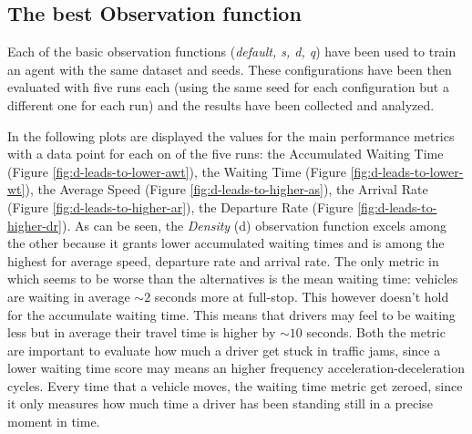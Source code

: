 \subsection{The best Observation function}

Each of the basic observation functions (\textit{default, s, d, q}) have been used to train an agent with the same dataset and seeds. These configurations have been then evaluated with five runs each (using the same seed for each configuration but a different one for each run) and the results have been collected and analyzed.

In the following plots are displayed the values for the main performance metrics with a data point for each on of the five runs: the Accumulated Waiting Time (Figure \ref{fig:d-leads-to-lower-awt}), the Waiting Time (Figure \ref{fig:d-leads-to-lower-wt}), the Average Speed (Figure \ref{fig:d-leads-to-higher-as}), the Arrival Rate (Figure \ref{fig:d-leads-to-higher-ar}), the Departure Rate (Figure \ref{fig:d-leads-to-higher-dr}).
As can be seen, the \textit{Density} (d) observation function excels among the other because it grants lower accumulated waiting times and is among the highest for average speed, departure rate and arrival rate.
The only metric in which seems to be worse than the alternatives is the mean waiting time: vehicles are waiting in average $\sim2$ seconds more at full-stop.
This however doesn't hold for the accumulate waiting time.
This means that drivers may feel to be waiting less but in average their travel time is higher by $\sim10$ seconds.
Both the metric are important to evaluate how much a driver get stuck in traffic jams, since a lower waiting time score may means an higher frequency acceleration-deceleration cycles.
Every time that a vehicle moves, the waiting time metric get zeroed, since it only measures how much time a driver has been standing still in a precise moment in time.


